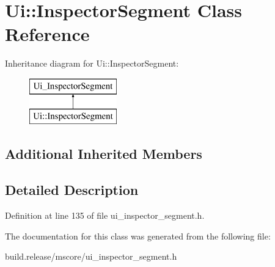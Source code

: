 \hypertarget{class_ui_1_1_inspector_segment}{}\section{Ui\+:\+:Inspector\+Segment Class Reference}
\label{class_ui_1_1_inspector_segment}
Inheritance diagram for Ui\+:\+:Inspector\+Segment\+:\begin{figure}[H]
\begin{center}
\leavevmode
\includegraphics[height=2.000000cm]{class_ui_1_1_inspector_segment}
\end{center}
\end{figure}
\subsection*{Additional Inherited Members}


\subsection{Detailed Description}


Definition at line 135 of file ui\+\_\+inspector\+\_\+segment.\+h.



The documentation for this class was generated from the following file\+:\begin{DoxyCompactItemize}
\item 
build.\+release/mscore/ui\+\_\+inspector\+\_\+segment.\+h\end{DoxyCompactItemize}
